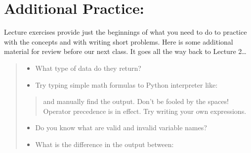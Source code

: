 \documentclass[letterpaper,10pt,english]{sphinxmanual}
\begin{document}
\section{Additional Practice:}
\label{\detokenize{lecture_notes/lec05_functions2:additional-practice}}
Lecture exercises provide just the beginnings of what you need to
do to practice with the concepts and with writing short problems.
Here is some additional material for review before our next class.  It
goes all the way back to Lecture 2…
\begin{quote}
\begin{itemize}
\item {} 
 What type of data do they return?

\item {} 
Try typing simple math formulas to Python interpreter like:

\begin{sphinxVerbatim}[commandchars=\\\{\}]
                  
\end{sphinxVerbatim}

\end{itemize}
\begin{quote}

and manually find the output. Don’t be fooled by the spaces!
Operator precedence is in effect. Try writing your own expressions.
\end{quote}
\begin{itemize}
\item {} 
 Do you know what are valid and invalid variable names?

\item {} 
What is the difference in the output between:

\begin{sphinxVerbatim}[commandchars=\\\{\}]
  
  
    
         
\end{sphinxVerbatim}


\end{itemize}
\end{quote}
\end{document}
